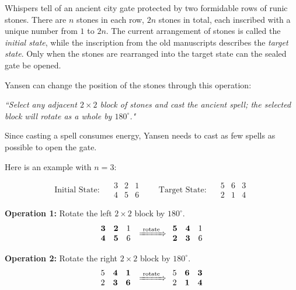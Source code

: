 \problem{}
Whispers tell of an ancient city gate protected by two formidable rows of runic stones.
There are $n$ stones in each row, $2n$ stones in total, each inscribed with a unique number from $1$ to $2n$.  
The current arrangement of stones is called the \textit{initial state}, while the inscription from the old manuscripts describes the \textit{target state}.  
Only when the stones are rearranged into the target state can the sealed gate be opened.  

\noindent Yansen can change the position of the stones through this operation:  

\textit{``Select any adjacent $2 \times 2$ block of stones and cast the ancient spell; the selected block will rotate as a whole by $180^\circ$."}

Since casting a spell consumes energy, Yansen needs to cast as few spells as possible to open the gate.

\vspace{1\baselineskip}

\noindent Here is an example with $n=3$:

\[
\text{Initial State: }\quad 
\begin{array}{ccc}
3 & 2 & 1 \\
4 & 5 & 6
\end{array}
\qquad
\text{Target State: }\quad
\begin{array}{ccc}
5 & 6 & 3 \\
2 & 1 & 4
\end{array}
\]

\noindent\textbf{Operation 1:} Rotate the left $2\times2$ block by $180^\circ$.
\[
\begin{array}{ccc}
\textbf{3} & \textbf{2} & 1\\
\textbf{4} & \textbf{5} & 6
\end{array}
\;\xRightarrow{\;\text{rotate}\;}
\begin{array}{ccc}
\textbf{5} & \textbf{4} & 1\\
\textbf{2} & \textbf{3} & 6
\end{array}
\]

\noindent\textbf{Operation 2:} Rotate the right $2\times2$ block by $180^\circ$.
\[
\begin{array}{ccc}
5 & \textbf{4} & \textbf{1}\\
2 & \textbf{3} & \textbf{6}
\end{array}
\;\xRightarrow{\;\text{rotate}\;}
\begin{array}{ccc}
5 & \textbf{6} & \textbf{3}\\
2 & \textbf{1} & \textbf{4}
\end{array}
\]

